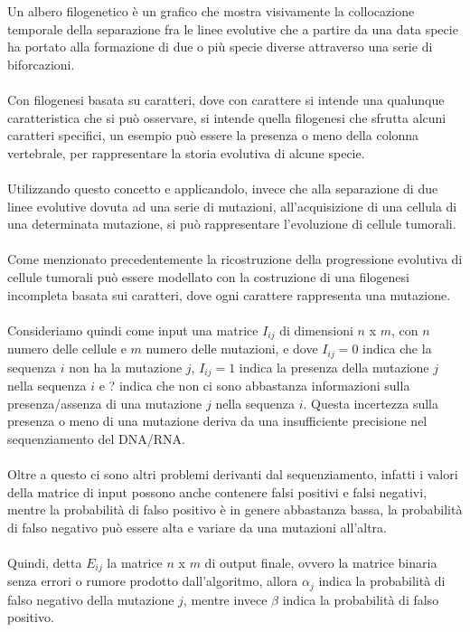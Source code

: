 \documentclass[12pt]{report}
\begin{document}
  Un albero filogenetico è un grafico che mostra visivamente la collocazione temporale della separazione fra le linee evolutive che a partire da una data specie ha portato alla formazione di due o più specie diverse attraverso una serie di biforcazioni.\\\\
  Con filogenesi basata su caratteri, dove con carattere si intende una qualunque caratteristica che si può osservare, si intende quella filogenesi che sfrutta alcuni caratteri specifici, un esempio può essere la presenza o meno della colonna vertebrale, per rappresentare la storia evolutiva di alcune specie.\\\\
  Utilizzando questo concetto e applicandolo, invece che alla separazione di due linee evolutive dovuta ad una serie di mutazioni, all'acquisizione di una cellula di una determinata mutazione, si può rappresentare l'evoluzione di cellule tumorali.\\\\
  Come menzionato precedentemente la ricostruzione della progressione evolutiva di cellule tumorali può essere modellato con la costruzione di una filogenesi incompleta basata sui caratteri, dove ogni carattere rappresenta una mutazione.\\\\
  Consideriamo quindi come input una matrice ${I}_{ij}$ di dimensioni $n$ x $m$, con $n$ numero delle cellule e $m$ numero delle mutazioni, e dove ${I}_{ij} = 0$ indica che la sequenza $i$ non ha la mutazione $j$, ${I}_{ij} = 1$ indica la presenza della mutazione $j$ nella sequenza $i$ e ? indica che non ci sono abbastanza informazioni sulla presenza/assenza di una mutazione $j$ nella sequenza $i$.
  Questa incertezza sulla presenza o meno di una mutazione deriva da una insufficiente precisione nel sequenziamento del DNA/RNA.\\\\
  Oltre a questo ci sono altri problemi derivanti dal sequenziamento, infatti i valori della matrice di input possono anche contenere falsi positivi e falsi negativi, mentre la probabilità di falso positivo è in genere abbastanza bassa, la probabilità di falso negativo può essere alta e variare da una mutazioni all'altra.\\\\
  Quindi, detta $E_{ij}$ la matrice $n$ x $m$ di output finale, ovvero la matrice binaria senza errori o rumore prodotto dall'algoritmo, allora ${\alpha}_{j}$ indica la probabilità di falso negativo della mutazione $j$, mentre invece $\beta$ indica la probabilità di falso positivo.\\
\end{document}
